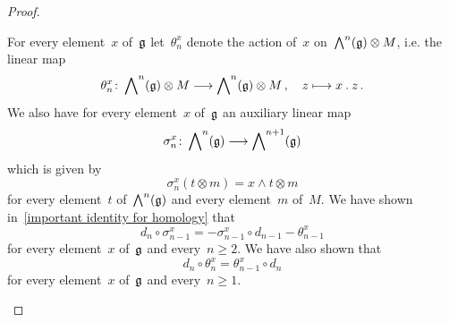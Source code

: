 \begin{proof}
\begin{enumerate}
      For every element~$x$ of~$\mathfrak{g}$ let~$\theta_n^x$ denote the action of~$x$ on~$\operatorname{\bigwedge}^n(\mathfrak{g}) \otimes M$, i.e. the linear map
      \[
        \theta_n^x
        \colon
        \Exterior^n(\glie) \otimes M
        \to
        \Exterior^n(\glie) \otimes M \,,
        \quad
        z
        \mapsto
        x \act z \,.
      \]
      We also have for every element~$x$ of~$\mathfrak{g}$ an auxiliary linear map
      \[
        \sigma_n^x
        \colon
        \Exterior^n(\glie)
        \to
        \Exterior^{n+1}(\glie)
      \]
      which is given by
      \[
        \sigma_n^x( t \otimes m)
        =
        x \wedge t \otimes m
      \]
      for every element~$t$ of~$\operatorname{\bigwedge}^n(\mathfrak{g})$ and every element~$m$ of~$M$.
      We have shown in~\eqref{important identity for homology} that
      \[
        d_n \circ \sigma_{n-1}^x
        =
        - \sigma_{n-1}^x \circ d_{n-1}
        - \theta_{n-1}^x
      \]
      for every element~$x$ of~$\mathfrak{g}$ and every~$n \geq 2$.
      We have also shown that
      \[
        d_n \circ \theta_n^x
        =
        \theta_{n-1}^x \circ d_n
      \]
      for every element~$x$ of~$\mathfrak{g}$ and every~$n \geq 1$.


\end{enumerate}
\end{proof}
